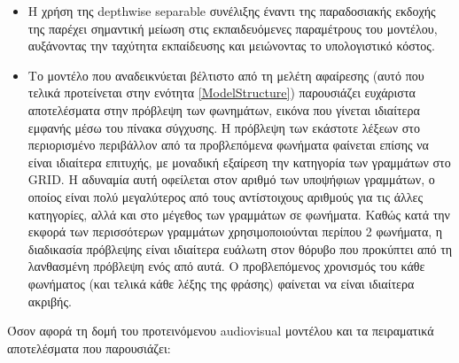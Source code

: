 \begin{itemize}
\item Η χρήση της depthwise separable συνέλιξης έναντι της παραδοσιακής εκδοχής της παρέχει σημαντική μείωση στις εκπαιδευόμενες παραμέτρους του μοντέλου, αυξάνοντας την ταχύτητα εκπαίδευσης και μειώνοντας το υπολογιστικό κόστος.

\item Το μοντέλο που αναδεικνύεται βέλτιστο από τη μελέτη αφαίρεσης (αυτό που τελικά προτείνεται στην ενότητα \ref{ModelStructure}) παρουσιάζει ευχάριστα αποτελέσματα στην πρόβλεψη των φωνημάτων, εικόνα που γίνεται ιδιαίτερα εμφανής μέσω του πίνακα σύγχυσης. Η πρόβλεψη των εκάστοτε λέξεων στο περιορισμένο περιβάλλον από τα προβλεπόμενα φωνήματα φαίνεται επίσης να είναι ιδιαίτερα επιτυχής, με μοναδική εξαίρεση την κατηγορία των γραμμάτων στο GRID. Η αδυναμία αυτή οφείλεται στον αριθμό των υποψήφιων γραμμάτων, ο οποίος είναι πολύ μεγαλύτερος από τους αντίστοιχους αριθμούς για τις άλλες κατηγορίες, αλλά και στο μέγεθος των γραμμάτων σε φωνήματα. Καθώς κατά την εκφορά των περισσότερων γραμμάτων χρησιμοποιούνται περίπου 2 φωνήματα, η διαδικασία πρόβλεψης είναι ιδιαίτερα ευάλωτη στον θόρυβο που προκύπτει από τη λανθασμένη πρόβλεψη ενός από αυτά. Ο προβλεπόμενος χρονισμός του κάθε φωνήματος (και τελικά κάθε λέξης της φράσης) φαίνεται να είναι ιδιαίτερα ακριβής.
\end{itemize}

Όσον αφορά τη δομή του προτεινόμενου audiovisual μοντέλου και τα πειραματικά αποτελέσματα που παρουσιάζει:

